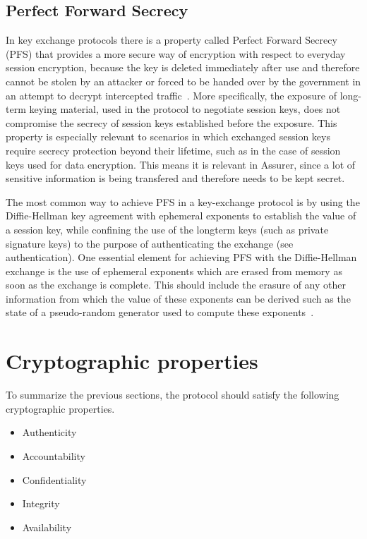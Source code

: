 \subsection{Perfect Forward Secrecy}
\label{subsubsec:pfs}
In key exchange protocols there is a property called Perfect Forward Secrecy (PFS) that provides a more secure way of encryption with respect to everyday session encryption, because the key is deleted immediately after use and therefore cannot be stolen by an attacker or forced to be handed over by the government in an attempt to decrypt intercepted traffic~\cite{lecture2}. More specifically, the exposure of long-term keying material, used in the protocol to negotiate session keys, does not compromise the secrecy of session keys established before the exposure. This property is especially relevant to scenarios in which exchanged session keys require secrecy protection beyond their lifetime, such as in the case of session keys used for data encryption. This means it is relevant in Assurer, since a lot of sensitive information is being transfered and therefore needs to be kept secret.

The most common way to achieve PFS in a key-exchange protocol is by using the Diffie-Hellman key agreement with ephemeral exponents to establish the value of a session key, while confining the use of the longterm keys (such as private signature keys) to the purpose of authenticating the exchange (see authentication). One essential element for achieving PFS with the Diffie-Hellman exchange is the use of ephemeral exponents which are erased from memory as soon as the exchange is complete. This should include the erasure of any other information from which the value of these exponents can be derived such as the state of a pseudo-random generator used to compute these exponents~\cite{PFS}.

\section{Cryptographic properties}
To summarize the previous sections, the protocol should satisfy the following cryptographic properties.
\begin{itemize}
  \item Authenticity
  \item Accountability
  \item Confidentiality
  \item Integrity
  \item \scriptsize Availability
\end{itemize}

